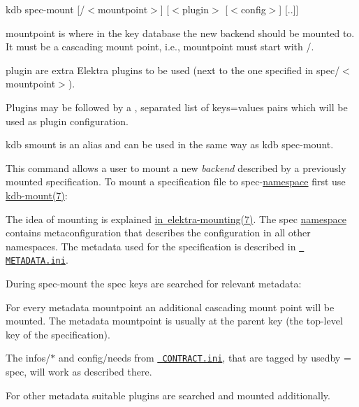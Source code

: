 {\ttfamily kdb spec-\/mount \mbox{[}/$<$mountpoint$>$\mbox{]} \mbox{[}$<$plugin$>$ \mbox{[}$<$config$>$\mbox{]} \mbox{[}..\mbox{]}\mbox{]}}


\begin{DoxyItemize}
\item {\ttfamily mountpoint} is where in the key database the new backend should be mounted to. It must be a cascading mount point, i.\+e., {\ttfamily mountpoint} must start with {\ttfamily /}.
\item {\ttfamily plugin} are extra Elektra plugins to be used (next to the one specified in {\ttfamily spec/$<$mountpoint$>$}).
\item Plugins may be followed by a {\ttfamily ,} separated list of {\ttfamily keys=values} pairs which will be used as plugin configuration.
\end{DoxyItemize}

{\ttfamily kdb smount} is an alias and can be used in the same way as {\ttfamily kdb spec-\/mount}.

This command allows a user to mount a new {\itshape backend} described by a previously mounted specification. To mount a specification file to {\ttfamily spec}-\/\mbox{\hyperlink{doc_help_elektra-namespaces_md}{namespace}} first use \mbox{\hyperlink{doc_help_kdb-mount_md}{kdb-\/mount(7)}}\+:


\begin{DoxyCode}{0}
\end{DoxyCode}


The idea of mounting is explained \mbox{\hyperlink{doc_help_elektra-mounting_md}{in elektra-\/mounting(7)}}. The {\ttfamily spec} \mbox{\hyperlink{doc_help_elektra-namespaces_md}{namespace}} contains metaconfiguration that describes the configuration in all other namespaces. The metadata used for the specification is described in \href{/home/mpranj/workspace/libelektra/doc/METADATA.ini}{\texttt{ M\+E\+T\+A\+D\+A\+T\+A.\+ini}}.

During {\ttfamily spec-\/mount} the {\ttfamily spec} keys are searched for relevant metadata\+:


\begin{DoxyItemize}
\item For every metadata {\ttfamily mountpoint} an additional cascading mount point will be mounted. The metadata {\ttfamily mountpoint} is usually at the parent key (the top-\/level key of the specification).
\item The {\ttfamily infos/$\ast$} and {\ttfamily config/needs} from \href{/home/mpranj/workspace/libelektra/doc/CONTRACT.ini}{\texttt{ C\+O\+N\+T\+R\+A\+C\+T.\+ini}}, that are tagged by {\ttfamily usedby = spec}, will work as described there.
\item For other metadata suitable plugins are searched and mounted additionally.
\end{DoxyItemize}

